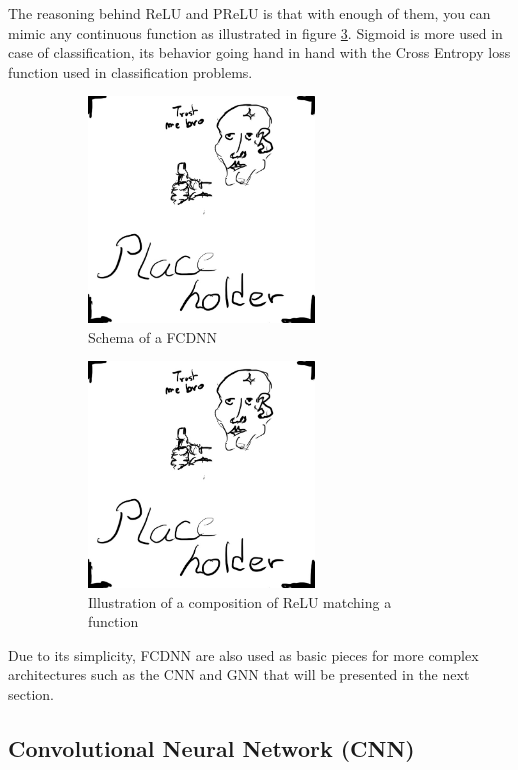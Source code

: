 \documentclass[../main.tex]{subfiles}
\begin{document}
The reasoning behind ReLU and PReLU is that with enough of them, you can mimic any continuous function as illustrated in figure \ref{fig:ml:relu-mimic}. Sigmoid is more used in case of classification, its behavior going hand in hand with the Cross Entropy loss function used in classification problems.

\begin{figure}[ht]
  \begin{subfigure}[t]{0.48\textwidth}
    \centering
    \includegraphics[height=6cm]{images/placeholder.jpg}
    \caption{Schema of a FCDNN}
    \label{fig:ml:fcdnn}
  \end{subfigure}
  \hfill
  \begin{subfigure}[t]{0.48\textwidth}
    \centering
    \includegraphics[height=6cm]{images/placeholder.jpg}
    \caption{Illustration of a composition of ReLU matching a function}
    \label{fig:ml:relu-mimic}
  \end{subfigure}
  \caption{}
\end{figure}

Due to its simplicity, FCDNN are also used as basic pieces for more complex architectures such as the CNN and GNN that will be presented in the next section.

\subsection{Convolutional Neural Network (CNN)}
\label{sec:ml:cnn}
\end{document}
